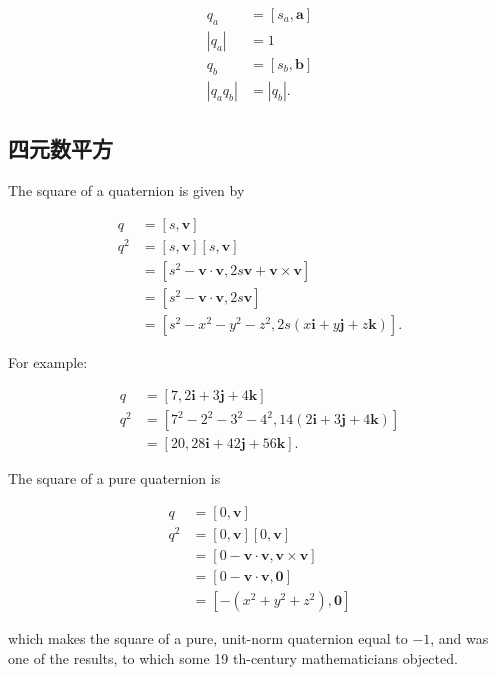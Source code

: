 $$
\begin{aligned}
q_{a} & =\left[s_{a}, \mathbf{a}\right] \\
\left|q_{a}\right| & =1 \\
q_{b} & =\left[s_{b}, \mathbf{b}\right] \\
\left|q_{a} q_{b}\right| & =\left|q_{b}\right| .
\end{aligned}
$$

\subsection{四元数平方}
The square of a quaternion is given by

$$
\begin{aligned}
q & =[s, \mathbf{v}] \\
q^{2} & =[s, \mathbf{v}][s, \mathbf{v}] \\
& =\left[s^{2}-\mathbf{v} \cdot \mathbf{v}, 2 s \mathbf{v}+\mathbf{v} \times \mathbf{v}\right] \\
& =\left[s^{2}-\mathbf{v} \cdot \mathbf{v}, 2 s \mathbf{v}\right] \\
& =\left[s^{2}-x^{2}-y^{2}-z^{2}, 2 s(x \mathbf{i}+y \mathbf{j}+z \mathbf{k})\right] .
\end{aligned}
$$

For example:

$$
\begin{aligned}
q & =[7,2 \mathbf{i}+3 \mathbf{j}+4 \mathbf{k}] \\
q^{2} & =\left[7^{2}-2^{2}-3^{2}-4^{2}, 14(2 \mathbf{i}+3 \mathbf{j}+4 \mathbf{k})\right] \\
& =[20,28 \mathbf{i}+42 \mathbf{j}+56 \mathbf{k}] .
\end{aligned}
$$

The square of a pure quaternion is

$$
\begin{aligned}
q & =[0, \mathbf{v}] \\
q^{2} & =[0, \mathbf{v}][0, \mathbf{v}] \\
& =[0-\mathbf{v} \cdot \mathbf{v}, \mathbf{v} \times \mathbf{v}] \\
& =[0-\mathbf{v} \cdot \mathbf{v}, \mathbf{0}] \\
& =\left[-\left(x^{2}+y^{2}+z^{2}\right), \mathbf{0}\right]
\end{aligned}
$$

which makes the square of a pure, unit-norm quaternion equal to $-1$, and was one of the results, to which some 19 th-century mathematicians objected.

